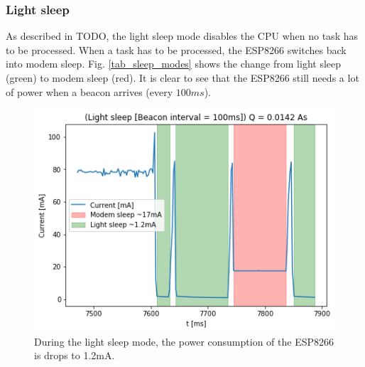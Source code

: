 \subsubsection{Light sleep}
As described in TODO, the light sleep mode disables the CPU when no task has to be processed.
When a task has to be processed, the ESP8266 switches back into modem sleep.
Fig. \ref{tab_sleep_modes} shows the change from light sleep (green) to modem sleep (red).
It is clear to see that the ESP8266 still needs a lot of power when a beacon arrives (every $100ms$).

\begin{figure}[h]
    \includegraphics[width = \linewidth]{fig/light_sleep.png}
    \caption{During the light sleep mode, the power consumption of the ESP8266 is drops to 1.2mA.}
    \label{fig:light_sleep}
\end{figure}

